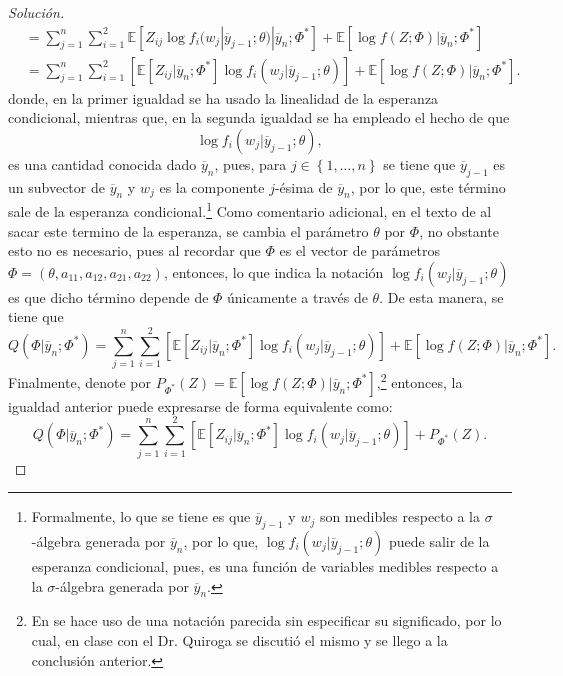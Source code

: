 \documentclass[10.5pt,notitlepage]{article}
\newenvironment{solucion}
  {\begin{proof}[Solución]}
  {\end{proof}}
\newcommand{\EE}{\mathbb{E}}
\newcommand{\corch}[1]{\left[ #1 \right]}
\newcommand{\kis}[1]{\left\{ #1 \right\}}
\theoremstyle{plain}
\begin{document}
\begin{solucion}
\begin{align*}
                                        &=  \sum_{j = 1}^{n}\sum_{i = 1}^{2}\EE\corch{Z_{ij}\log f_{i}(w_j | \overline{y}_{j-1};\theta) |\overline{y}_{n}; \Phi^{*}} + \EE\corch{\log f(Z ; \Phi)|\overline{y}_{n}; \Phi^{*}}\nonumber\\
                                        &=  \sum_{j = 1}^{n}\sum_{i = 1}^{2}\corch{\EE\corch{Z_{ij}|\overline{y}_{n}; \Phi^{*}}\log f_{i}(w_j | \overline{y}_{j-1};\theta)}  + \EE\corch{\log f(Z ; \Phi)|\overline{y}_{n}; \Phi^{*}}.
\end{align*}
donde, en la primer igualdad se ha usado la linealidad de la esperanza condicional, mientras que, en la segunda igualdad se ha empleado el hecho de que 
\[
\log f_{i}(w_j | \overline{y}_{j-1};\theta),
\]
es una cantidad conocida dado \(\overline{y}_{n}\), pues, para \(j \in \kis{1, \hdots, n}\) se tiene que \(\overline{y}_{j-1}\) es un subvector de \(\overline{y}_{n}\) y \(w_j\) es la componente \(j\)-ésima de \(\overline{y}_{n}\), por lo que, este término sale de la esperanza condicional.\footnote{Formalmente, lo que se tiene es que \(\overline{y}_{j-1}\) y \(w_j\) son medibles respecto a la \(\sigma\)-álgebra generada por \(\overline{y}_n\), por lo que, \(\log f_{i}(w_j | \overline{y}_{j-1};\theta)\) puede salir de la esperanza condicional, pues, es una función de variables medibles respecto a la \(\sigma\)-álgebra generada por \(\overline{y}_n\).} Como comentario adicional, en el texto de \textcite{mclachlan_em_2008} al sacar este termino de la esperanza, se cambia el parámetro \(\theta\) por \(\Phi\), no obstante esto no es necesario, pues al recordar que \(\Phi\) es el vector de parámetros \(\Phi = (\theta, a_{11},a_{12},a_{21},a_{22})\), entonces, lo que indica la notación \(\log f_{i}(w_j | \overline{y}_{j-1};\theta)\) es que dicho término depende de \(\Phi\) únicamente a través de \(\theta\). De esta manera, se tiene que 
\[
  Q(\Phi| \overline{y}_{n}; \Phi^{*}) = \sum_{j = 1}^{n}\sum_{i = 1}^{2}\corch{\EE\corch{Z_{ij}|\overline{y}_{n}; \Phi^{*}}\log f_{i}(w_j | \overline{y}_{j-1};\theta)}  + \EE\corch{\log f(Z ; \Phi)|\overline{y}_{n}; \Phi^{*}}.
\]
Finalmente, denote por \(P_{\Phi^{*}}(Z) = \EE\corch{\log f(Z ; \Phi)|\overline{y}_{n}; \Phi^{*}}\),\footnote{En \textcite{mclachlan_em_2008} se hace uso de una notación parecida sin especificar su significado, por lo cual, en clase con el Dr. Quiroga se discutió el mismo y se llego a la conclusión anterior.} entonces, la igualdad anterior puede expresarse de forma equivalente como: 
\[
Q(\Phi| \overline{y}_{n}; \Phi^{*}) = \sum_{j = 1}^{n}\sum_{i = 1}^{2}\corch{\EE\corch{Z_{ij}|\overline{y}_{n}; \Phi^{*}}\log f_{i}(w_j | \overline{y}_{j-1};\theta)}  + P_{\Phi^{*}}(Z).
\]
\end{solucion}
\end{document}
